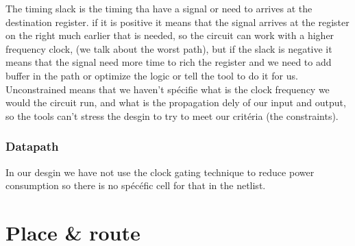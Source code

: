 \documentclass[12pt]{article}
\begin{document}
The timing slack is the timing tha have a signal or need to arrives at the destination register. if it is positive it means that the signal arrives at the register on the right much earlier that is needed, so the circuit can work with a higher frequency clock, (we talk about the worst path), but if the slack is negative it means that the signal need more time to rich the register and we need to add buffer in the path or optimize the logic or tell the tool to do it for us.\\
Unconstrained means that we haven't spécifie what is the clock frequency we would the circuit run, and what is the propagation dely of our input and output, so the tools can't stress the desgin to try to meet our critéria (the constraints).

\subsubsection*{Datapath}

In our desgin we have not use the clock gating technique to reduce power consumption so there is no spécéfic cell for that in the netlist.

\section{Place \& route}
\end{document}
